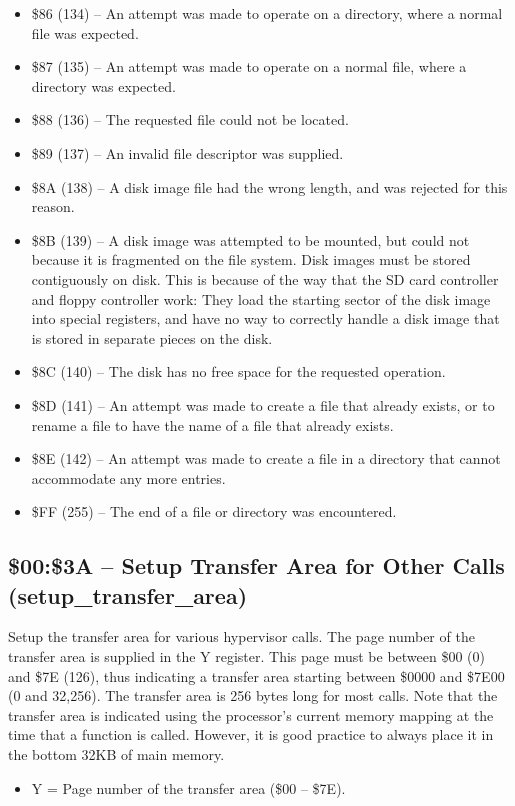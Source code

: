 \begin{itemize}
\item \$86 (134) -- An attempt was made to operate on a directory, where a normal file was expected.
\item \$87 (135) -- An attempt was made to operate on a normal file, where a directory was expected.
\item \$88 (136) -- The requested file could not be located.
\item \$89 (137) -- An invalid file descriptor was supplied.
\item \$8A (138) -- A disk image file had the wrong length, and was rejected for this reason.
\item \$8B (139) -- A disk image was attempted to be mounted, but could not because it is fragmented on the file system.  Disk images must be stored contiguously on disk. This is because of the way that the SD card controller and floppy controller work: They load the starting sector of the disk image into special registers, and have no way to correctly handle a disk image that is stored in separate pieces on the disk. 
\item \$8C (140) -- The disk has no free space for the requested operation.
\item \$8D (141) -- An attempt was made to create a file that already exists, or to rename a file to have the name of a file that already exists.
\item \$8E (142) -- An attempt was made to create a file in a directory that cannot accommodate any more entries.
\item \$FF (255) -- The end of a file or directory was encountered.
\end{itemize}

\subsection{\$00:\$3A -- Setup Transfer Area for Other Calls (setup\_transfer\_area)}

Setup the transfer area for various hypervisor calls. The page number of the transfer area is supplied in the Y register.
This page must be between \$00 (0) and \$7E (126), thus indicating a transfer area starting between \$0000 and \$7E00 (0 and 32,256).
The transfer area is
256 bytes long for most calls.  Note that the transfer area is indicated using the processor's current memory mapping at
the time that a function is called.  However, it is good practice to always place it in the bottom 32KB of main memory.

\begin{itemize}
  \item Y = Page number of the transfer area (\$00 -- \$7E).
\end{itemize}


